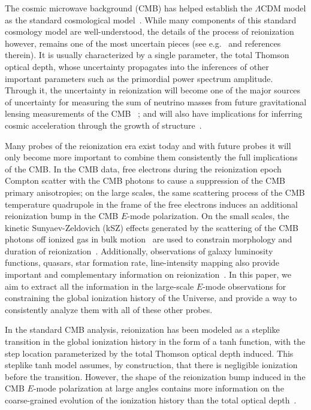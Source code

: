 \documentclass[prd,twocolumn,amsmath,amssymb,floatfix,superscriptaddress,nofootinbib]{revtex4-1}
\begin{document}
The cosmic microwave background (CMB) has helped establish the $\Lambda$CDM model as the standard cosmological model~\cite{Aghanim:2018eyx}. While many components of this standard cosmology model are well-understood, the details of the process of reionization however, remains one of the most uncertain pieces (see e.g.~\cite{2016ASSL..423.....M} and references therein).  It is usually characterized by a single parameter, the total Thomson optical depth, whose  uncertainty propagates into the inferences of other important parameters such as the primordial power spectrum amplitude. Through it, the uncertainty in reionization will become one of the major sources of uncertainty for measuring the sum of neutrino masses from future gravitational lensing measurements of the CMB~ \cite{Smith:2006nk,Allison:2015qca}; and will also have implications for inferring cosmic acceleration through the growth of structure~\cite{Hu:2003pt}. 

Many probes of  the reionization era exist today and with future probes it will only become more important to combine them consistently the full implications of the CMB. In the CMB data, free electrons during the reionization epoch Compton scatter with the CMB photons to cause a suppression of the CMB primary anisotropies; on the large scales, the same scattering process of the CMB temperature quadrupole in the frame of the free electrons induces an additional reionization bump in the CMB $E$-mode polarization. On the small scales, the kinetic Sunyaev-Zeldovich (kSZ) effects generated by the scattering of the CMB photons off ionized gas in bulk motion~\cite{Sunyaev:1970er, Sunyaev:1980vz} are used to constrain morphology and duration of reionization~\cite{mcquinn_2005,mesinger_2012_kSZ}. Additionally, observations of galaxy luminosity functions, quasars, star formation rate, line-intensity mapping also provide important and complementary information on reionization~\cite{2016ASSL..423.....M}. In this paper, we aim to extract all the information in the large-scale $E$-mode observations for constraining the global ionization history of the Universe, and provide a way to consistently analyze them with all of these other probes.
 
In the standard CMB analysis, reionization has been  modeled as a steplike transition in the global ionization history in the form of a tanh function, with the step location parameterized by the total Thomson optical depth induced. This steplike tanh model assumes, by construction, that there is negligible ionization before the transition. However, the shape of the reionization bump induced in the CMB $E$-mode polarization at large angles contains more information on the coarse-grained evolution of the ionization history than the total optical depth~\cite{Hu:2003gh, Mortonson:2007hq}. 
\end{document}
